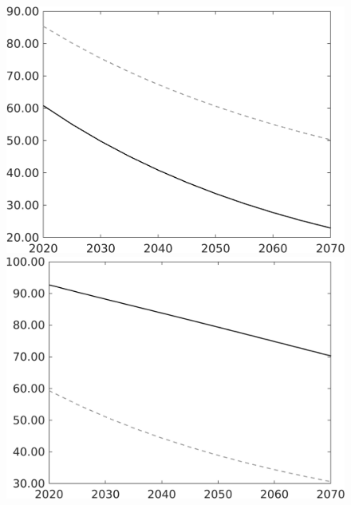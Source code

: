 \documentclass[12pt]{article}
\begin{document}
\begin{figure}
\begin{minipage}[]{0.32\textwidth}
	\end{minipage}
	\begin{minipage}[]{0.32\textwidth}
		\includegraphics[width=1\textwidth]{../../codding_model/own_basedOnFried/optimalPol_010922_revision/figures/all_13Sept22/LevTaufNoTauf_TaulCalib_Equlab_regime0_gAf_spillover0_nsk1_xgr0_knspil1_sep1_LFlimit0_emsbase0_countec0_GovRev0_etaa0.79_lgd0.png}
	\end{minipage}
	\begin{minipage}[]{0.32\textwidth}
		\includegraphics[width=1\textwidth]{../../codding_model/own_basedOnFried/optimalPol_010922_revision/figures/all_13Sept22/LevTaufNoTauf_TaulCalib_Equlab_regime0_gAg_spillover0_nsk1_xgr0_knspil1_sep1_LFlimit0_emsbase0_countec0_GovRev0_etaa0.79_lgd0.png}

\end{minipage}
\end{figure}
\end{document}
